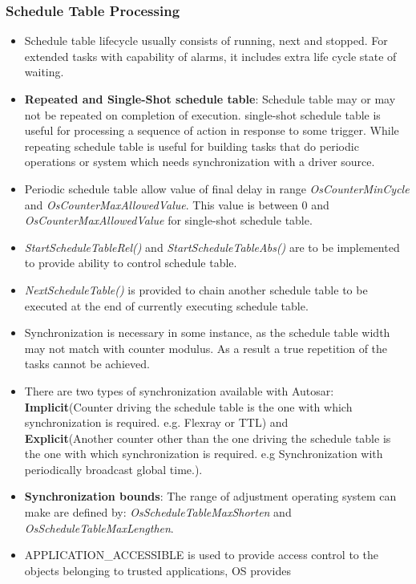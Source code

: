 \subsubsection*{Schedule Table Processing}
\begin{itemize}
	\item Schedule table lifecycle usually consists of running, next and stopped. For extended tasks with capability of alarms, it includes extra life cycle state of waiting.
	\item \textbf{Repeated and Single-Shot schedule table}: Schedule table may or may not be repeated on completion of execution. single-shot schedule table is useful for processing a sequence of action in response to some trigger. While repeating schedule table is useful for building tasks that do periodic operations or system which needs synchronization with a driver source.
	\item Periodic schedule table allow value of final delay in range \textit{OsCounterMinCycle} and \textit{OsCounterMaxAllowedValue}. This value is between 0 and \textit{OsCounterMaxAllowedValue} for single-shot schedule table.
	\item \textit{StartScheduleTableRel()} and \textit{StartScheduleTableAbs()} are to be implemented to provide ability to control schedule table.
	\item \textit{NextScheduleTable()} is provided to chain another schedule table to be executed at the end of currently executing schedule table.
	\item Synchronization is necessary in some instance, as the schedule table width may not match with counter modulus. As a result a true repetition of the tasks cannot be achieved.
	\item There are two types of synchronization available with Autosar:\\ \textbf{Implicit}(Counter driving the schedule table is the one with which synchronization is required. e.g. Flexray or TTL) and\\ \textbf{Explicit}(Another counter other than the one driving the schedule table is the one with which synchronization is required. e.g Synchronization with periodically broadcast global time.).
	\item \textbf{Synchronization bounds}: The range of adjustment operating system can make are defined by: \textit{OsScheduleTableMaxShorten} and \textit{OsScheduleTableMaxLengthen}.
	\item APPLICATION\_ACCESSIBLE is used to provide access control to the objects belonging to trusted applications, OS provides 

\end{itemize}
